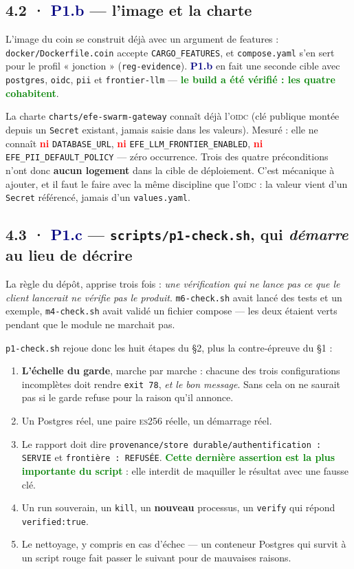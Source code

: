 \documentclass[10pt]{article}
\newcommand{\best}[1]{\textcolor{green}{\textbf{#1}}}
\newcommand{\pire}[1]{\textcolor{red}{\textbf{#1}}}
\newcommand{\code}[1]{\texttt{\small #1}}
\newcommand{\mm}[1]{\textbf{\textcolor{navy}{#1}}}
\begin{document}
\subsection{4.2 · \mm{P1.b} --- l'image et la charte}

L'image du coin se construit déjà avec un argument de features : \code{docker/Dockerfile.coin}
accepte \code{CARGO\_FEATURES}, et \code{compose.yaml} s'en sert pour le profil « jonction »
(\code{reg-evidence}). \mm{P1.b} en fait une seconde cible avec
\code{postgres}, \code{oidc}, \code{pii} et \code{frontier-llm} --- \best{le build a été vérifié :
les quatre cohabitent}.

La charte \code{charts/efe-swarm-gateway} connaît déjà l'\textsc{oidc} (clé publique montée depuis
un \code{Secret} existant, jamais saisie dans les valeurs). Mesuré : elle ne connaît \pire{ni}
\code{DATABASE\_URL}, \pire{ni} \code{EFE\_LLM\_FRONTIER\_ENABLED}, \pire{ni}
\code{EFE\_PII\_DEFAULT\_POLICY} --- zéro occurrence. Trois des quatre préconditions n'ont donc
\textbf{aucun logement} dans la cible de déploiement. C'est mécanique à ajouter, et il faut le faire
avec la même discipline que l'\textsc{oidc} : la valeur vient d'un \code{Secret} référencé, jamais
d'un \code{values.yaml}.

\subsection{4.3 · \mm{P1.c} --- \code{scripts/p1-check.sh}, qui \emph{démarre} au lieu de décrire}

La règle du dépôt, apprise trois fois : \emph{une vérification qui ne lance pas ce que le client
lancerait ne vérifie pas le produit}. \code{m6-check.sh} avait lancé des tests et un exemple,
\code{m4-check.sh} avait validé un fichier compose --- les deux étaient verts pendant que le module
ne marchait pas.

\code{p1-check.sh} rejoue donc les huit étapes du \S2, plus la contre-épreuve du \S1 :

\begin{enumerate}[leftmargin=1.5em,itemsep=1.5pt,topsep=2pt]
\item \textbf{L'échelle du garde}, marche par marche : chacune des trois configurations incomplètes
      doit rendre \code{exit 78}, \emph{et le bon message}. Sans cela on ne saurait pas si le garde
      refuse pour la raison qu'il annonce.
\item Un Postgres réel, une paire \textsc{es}256 réelle, un démarrage réel.
\item Le rapport doit dire \code{provenance/store durable/authentification : SERVIE} et
      \code{frontière : REFUSÉE}. \best{Cette dernière assertion est la plus importante du script} :
      elle interdit de maquiller le résultat avec une fausse clé.
\item Un run souverain, un \code{kill}, un \textbf{nouveau} processus, un \code{verify} qui répond
      \code{verified:true}.
\item Le nettoyage, y compris en cas d'échec --- un conteneur Postgres qui survit à un script rouge
      fait passer le suivant pour de mauvaises raisons.
\end{enumerate}
\end{document}
